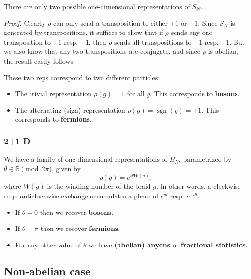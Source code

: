 \begin{lemma}
  There are only two possible one-dimensional representations of $S_N$.  
\end{lemma}

\begin{proof}
    Clearly $\rho$ can only send a transposition to either $+1$ or $-1$.   
  Since $S_N$ is generated by transpositions, it suffices to show that if $\rho$ sends any one transposition to $+1$ resp.  $-1$, then $\rho$ sends all transpositions to $+1$ resp. $-1$. But we also know that any two transpositions are conjugate, and since $\rho$ is abelian, the result easily follows.      
\end{proof}

These two reps correspond to two different particles:

\begin{itemize}
    \item The trivial representation $\rho (g) = 1$ for all $g$. This corresponds to \textbf{bosons}.
    \item The alternating (sign) representation $\rho(g) = \operatorname{sgn} (g) = \pm 1$. This corresponds to \textbf{fermions}.    
\end{itemize}

\subsubsection{2+1 D}


We have a family of one-dimensional representations of $B_N$, parametrized by $\theta \in \mathbb{R} \pmod {2 \pi}$, given by $$
\rho(g) = e^{i \theta W(g)}
,$$
where $W(g)$ is the winding number of the braid $g$. In other words,
a clockwise resp. anticlockwise exchange accumulates a phase of $e^{i \theta}$ resp. $e^{- i \theta}$. 



\begin{itemize}
    \item If $\theta = 0$ then we recover \textbf{bosons}.
    \item If $\theta = \pi$ then we recover \textbf{fermions}.
    \item For any other value of $\theta$ we have \textbf{(abelian) anyons} or \textbf{fractional statistics}.   
\end{itemize}

\subsection{Non-abelian case}

